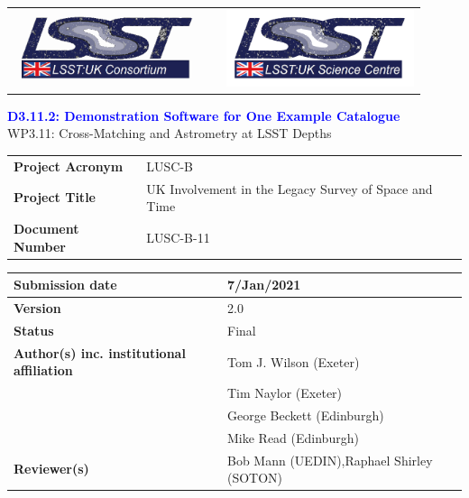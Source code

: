 \documentclass[a4paper,11pt]{scrartcl}
\def\title{D3.11.2: Demonstration Software for One Example Catalogue}
\begin{document}
\begin{center}
\begin{tabular}{p{6cm}p{4cm}p{6cm}}
\includegraphics[width=5.5cm]{lsst-uk_consortium_small.png} & & \includegraphics[width=5.5cm]{lsst-uk_science_centre_small.png} \\
\end{tabular}
\end{center}

\thispagestyle{fancy}
\begin{center}
{\Huge\textcolor{Blue}{\textbf{\title}}}\\[2ex]

{\LARGE\textcolor{BrickRed}{WP3.11: Cross-Matching and Astrometry at LSST Depths}}\\

\end{center}

\begin{table}[ht]
\centering
\renewcommand{\arraystretch}{1.75}
\begin{tabular}{>{\bfseries}p{4.5cm}p{11.5cm}}
Project Acronym & LUSC-B\\
Project Title   & UK Involvement in the Legacy Survey of Space and Time\\
Document Number & LUSC-B-11
\end{tabular}
\end{table}

\begin{table}[ht]
\centering
\renewcommand{\arraystretch}{1.75}
\begin{tabular}{|>{\bfseries}p{4.5cm}|p{11.5cm}|}
\hline
Submission date & 7/Jan/2021 \\\hline
Version & 2.0 \\\hline
Status  & Final \\\hline
\parbox{4cm}{Author(s) inc. institutional affiliation} & Tom J. Wilson (Exeter) \\ & Tim Naylor (Exeter) \\ & George Beckett (Edinburgh) \\ & Mike Read (Edinburgh) \\\hline
Reviewer(s) & \parbox{11cm}{\raggedright Bob Mann (UEDIN),\linebreak Raphael Shirley (SOTON)}\\\hline
\end{tabular}\\[2ex]
\end{table}
\end{document}
